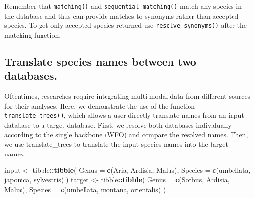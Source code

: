 \documentclass[
  11pt,
]{article}
\newenvironment{Shaded}{\begin{snugshade}}{\end{snugshade}}
\newcommand{\AttributeTok}[1]{\textcolor[rgb]{0.13,0.29,0.53}{#1}}
\newcommand{\FunctionTok}[1]{\textcolor[rgb]{0.13,0.29,0.53}{\textbf{#1}}}
\newcommand{\NormalTok}[1]{#1}
\newcommand{\OtherTok}[1]{\textcolor[rgb]{0.56,0.35,0.01}{#1}}
\newcommand{\SpecialCharTok}[1]{\textcolor[rgb]{0.81,0.36,0.00}{\textbf{#1}}}
\newcommand{\StringTok}[1]{\textcolor[rgb]{0.31,0.60,0.02}{#1}}
\begin{document}
\noindent Remember that \verb|matching()| and
\verb|sequential_matching()| match any species in the database and thus
can provide matches to synonyms rather than accepted species. To get
only accepted species returned use \verb|resolve_synonyms()| after the
matching function.

\hypertarget{translate-species-names-between-two-databases.}{%
\subsection{Translate species names between two
databases.}\label{translate-species-names-between-two-databases.}}

Oftentimes, researches require integrating multi-modal data from
different sources for their analyses. Here, we demonstrate the use of
the function \verb|translate_trees()|, which allows a user directly
translate names from an input database to a target database. First, we
resolve both databases individually according to the single backbone
(WFO) and compare the resolved names. Then, we use translate\_trees to
translate the input species names into the target names.

\begin{Shaded}
\begin{Highlighting}[]
\NormalTok{input }\OtherTok{\textless{}{-}}\NormalTok{ tibble}\SpecialCharTok{::}\FunctionTok{tibble}\NormalTok{(}
  \AttributeTok{Genus =} \FunctionTok{c}\NormalTok{(}\StringTok{\textquotesingle{}Aria\textquotesingle{}}\NormalTok{, }\StringTok{\textquotesingle{}Ardisia\textquotesingle{}}\NormalTok{, }\StringTok{\textquotesingle{}Malus\textquotesingle{}}\NormalTok{),}
  \AttributeTok{Species =} \FunctionTok{c}\NormalTok{(}\StringTok{\textquotesingle{}umbellata\textquotesingle{}}\NormalTok{, }\StringTok{\textquotesingle{}japonica\textquotesingle{}}\NormalTok{, }\StringTok{\textquotesingle{}sylvestris\textquotesingle{}}\NormalTok{)}
\NormalTok{)}
\NormalTok{target }\OtherTok{\textless{}{-}}\NormalTok{ tibble}\SpecialCharTok{::}\FunctionTok{tibble}\NormalTok{(}
  \AttributeTok{Genus =} \FunctionTok{c}\NormalTok{(}\StringTok{\textquotesingle{}Sorbus\textquotesingle{}}\NormalTok{, }\StringTok{\textquotesingle{}Ardisia\textquotesingle{}}\NormalTok{, }\StringTok{\textquotesingle{}Malus\textquotesingle{}}\NormalTok{),}
  \AttributeTok{Species =} \FunctionTok{c}\NormalTok{(}\StringTok{\textquotesingle{}umbellata\textquotesingle{}}\NormalTok{, }\StringTok{\textquotesingle{}montana\textquotesingle{}}\NormalTok{, }\StringTok{\textquotesingle{}orientalis\textquotesingle{}}\NormalTok{)}
\NormalTok{)}
\end{Highlighting}
\end{Shaded}
\end{document}
